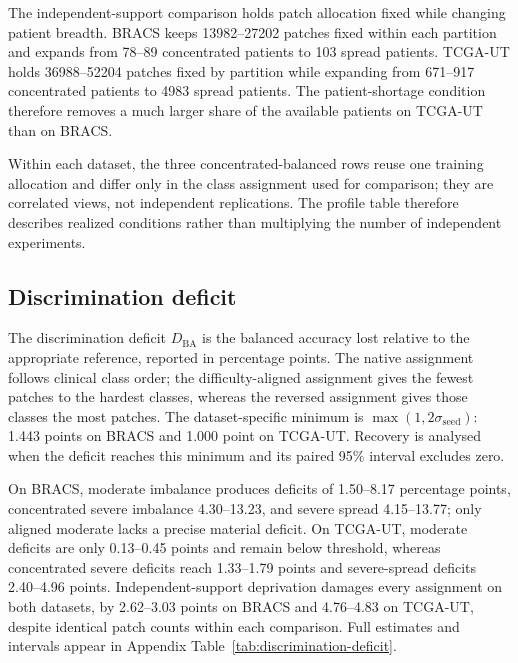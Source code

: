 \documentclass[11pt]{article}
\newcommand{\resultstable}[1]{}
\begin{document}
\begin{table}[ht]
  \centering
  \scriptsize
  \setlength{\tabcolsep}{3pt}
  \resultstable{signal_profiles}
  \caption{Realized shortages for the four comparisons. Shortage scores $S$ are standardized within each dataset; negative values mean below-average shortage. $A$ is the unstandardized support--difficulty correlation. Dominance compares eligible signed scores, including standardized $-A$, with a \num{0.25}-standard-deviation ambiguity margin.}
  \label{tab:signal-profiles}
\end{table}

\noindent The independent-support comparison holds patch allocation fixed while changing patient breadth. BRACS keeps \num{13982}--\num{27202} patches fixed within each partition and expands from \num{78}--\num{89} concentrated patients to \num{103} spread patients. TCGA-UT holds \num{36988}--\num{52204} patches fixed by partition while expanding from \num{671}--\num{917} concentrated patients to \num{4983} spread patients. The patient-shortage condition therefore removes a much larger share of the available patients on TCGA-UT than on BRACS.

Within each dataset, the three concentrated-balanced rows reuse one training allocation and differ only in the class assignment used for comparison; they are correlated views, not independent replications. The profile table therefore describes realized conditions rather than multiplying the number of independent experiments.

\subsection{Discrimination deficit}
\label{sec:rq1-discrimination}
The discrimination deficit $D_{\mathrm{BA}}$ is the balanced accuracy lost relative to the appropriate reference, reported in percentage points. The native assignment follows clinical class order; the difficulty-aligned assignment gives the fewest patches to the hardest classes, whereas the reversed assignment gives those classes the most patches. The dataset-specific minimum is $\max(\num{1},2\sigma_{\mathrm{seed}})$: \num{1.443} points on BRACS and \num{1.000} point on TCGA-UT. Recovery is analysed when the deficit reaches this minimum and its paired \num{95}\% interval excludes zero.

On BRACS, moderate imbalance produces deficits of \num{1.50}--\num{8.17} percentage points, concentrated severe imbalance \num{4.30}--\num{13.23}, and severe spread \num{4.15}--\num{13.77}; only aligned moderate lacks a precise material deficit. On TCGA-UT, moderate deficits are only \num{0.13}--\num{0.45} points and remain below threshold, whereas concentrated severe deficits reach \num{1.33}--\num{1.79} points and severe-spread deficits \num{2.40}--\num{4.96} points. Independent-support deprivation damages every assignment on both datasets, by \num{2.62}--\num{3.03} points on BRACS and \num{4.76}--\num{4.83} on TCGA-UT, despite identical patch counts within each comparison. Full estimates and intervals appear in Appendix Table~\ref{tab:discrimination-deficit}.
\end{document}
